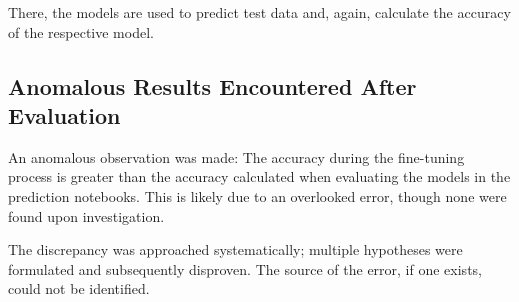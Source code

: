 \documentclass{article}
\begin{document}
There, the models are used to predict test data and, again, calculate the accuracy of the respective model.

\subsection{Anomalous Results Encountered After Evaluation}

An anomalous observation was made: The accuracy during the fine-tuning process is greater than the accuracy calculated when evaluating the models in the prediction notebooks. This is likely due to an overlooked error, though none were found upon investigation.

The discrepancy was approached systematically; multiple hypotheses were formulated and subsequently disproven. The source of the error, if one exists, could not be identified.
\end{document}
